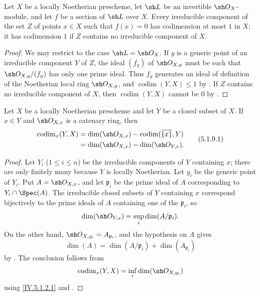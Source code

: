 \begin{corollary}[5.1.8]
\label{IV.5.1.8}
Let $X$ be a locally Noetherian prescheme, let $\sh L$ be an
invertible $\sh O_X$-module, and let $f$ be a section of $\sh L$ over
$X$.
Every irreducible component of the set $Z$ of points $x\in X$ such
that $f(x)=0$ has codimension at most $1$ in $X$; it has codimension
$1$ if $Z$ contains no irreducible component of $X$.
\end{corollary}

\begin{proof}
We may restrict to the case $\sh L=\sh O_X$.
If $y$ is a generic point of an irreducible component $Y$ of $Z$,
the ideal $(f_y)$ of $\sh O_{X,y}$ must be such that
$\sh O_{X,y}/(f_y)$ has only one prime ideal.
Thus $f_y$ generates an ideal of definition of the Noetherian local
ring $\sh O_{X,y}$, and
$\operatorname{codim}(Y,X)\leq1$ by .
If $Z$ contains no irreducible component of $X$, then
$\operatorname{codim}(Y,X)$ cannot be $0$ by
.
\end{proof}


\begin{proposition}[5.1.9]
\label{IV.5.1.9}
Let $X$ be a locally Noetherian prescheme and let $Y$ be a closed
subset of $X$.
If $x\in Y$ and $\sh O_{X,x}$ is a catenary ring, then
\begin{equation}
\begin{split}
\operatorname{codim}_x(Y,X)
&=\dim(\sh O_{X,x})-\operatorname{codim}(\overline{\{x\}},Y)\\
&=\dim(\sh O_{X,x})-\dim(\sh O_{Y,x}).
\end{split}
\tag{5.1.9.1}\label{IV.5.1.9.1}
\end{equation}
\end{proposition}

\begin{proof}
Let $Y_i$ ($1\leq i\leq n$) be the irreducible components of $Y$
containing $x$; there are only finitely many because $Y$ is locally
Noetherian.
Let $y_i$ be the generic point of $Y_i$.
Put $A=\sh O_{X,x}$, and let $\mathfrak p_i$ be the prime ideal of
$A$ corresponding to $Y_i\cap\Spec(A)$.
The irreducible closed subsets of $Y$ containing $x$ correspond
bijectively to the prime ideals of $A$ containing one of the
$\mathfrak p_i$, so
\[
\dim(\sh O_{Y,x})=\sup_i\dim(A/\mathfrak p_i).
\]
On the other hand, $\sh O_{X,y_i}=A_{\mathfrak p_i}$, and the
hypothesis on $A$ gives
\[
\dim(A)=\dim(A/\mathfrak p_i)+\dim(A_{\mathfrak p_i})
\]
by .
The conclusion follows from
\[
\operatorname{codim}_x(Y,X)
  =\inf_i\dim(\sh O_{X,y_i})
\]
using \eqref{IV.5.1.2.1} and .
\end{proof}

